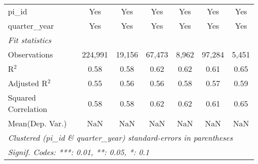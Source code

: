 \begin{tabular}{lcccccc}
   pi\_id                                                     & Yes           & Yes           & Yes           & Yes           & Yes           & Yes\\  
   quarter\_year                                              & Yes           & Yes           & Yes           & Yes           & Yes           & Yes\\  
   \midrule
   \emph{Fit statistics}\\
   Observations                                               & 224,991       & 19,156        & 67,473        & 8,962         & 97,284        & 5,451\\  
   R$^2$                                                      & 0.58          & 0.58          & 0.62          & 0.62          & 0.61          & 0.65\\  
   Adjusted R$^2$                                             & 0.55          & 0.56          & 0.56          & 0.58          & 0.57          & 0.59\\  
   Squared Correlation                                        & 0.58          & 0.58          & 0.62          & 0.62          & 0.61          & 0.65\\  
Mean(Dep. Var.) & NaN & NaN & NaN & NaN & NaN & NaN \\
   \midrule \midrule
   \multicolumn{7}{l}{\emph{Clustered (pi\_id \& quarter\_year) standard-errors in parentheses}}\\
   \multicolumn{7}{l}{\emph{Signif. Codes: ***: 0.01, **: 0.05, *: 0.1}}\\
\end{tabular}
\par\endgroup
